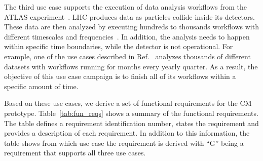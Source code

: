 The third use case supports the execution of data analysis workflows from the
ATLAS experiment~\cite{atlas}. LHC produces data as particles collide inside its
detectors. These data are then analyzed by executing hundreds to thousands
workflows with different timescales and frequencies~\cite{borodin2015big}. In
addition, the analysis needs to happen within specific time boundaries, while
the detector is not operational. For example, one of the use cases described in
Ref.~\cite{borodin2015big} analyzes thousands of different datasets with
workflows running for months every yearly quarter. As a result, the objective of
this use case campaign is to finish all of its workflows within a specific
amount of time.

Based on these use cases, we derive a set of functional requirements for the
CM prototype. Table~\ref{tab:fun_reqs} shows a summary of the
functional requirements. The table defines a requirement identification number,
states the requirement and provides a description of each requirement. In
addition to this information, the table shows from which use case the
requirement is derived with ``G'' being a requirement that supports all three
use cases.

